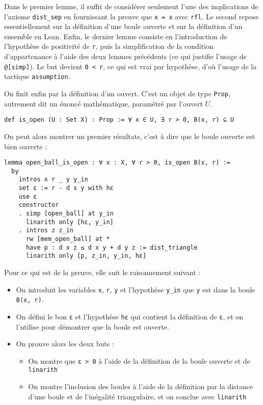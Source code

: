 \documentclass[a4paper, 12pt]{article}
\newcommand{\lean}[1]{\texttt{#1}}
\begin{document}
Dans le premier lemme, il suffit de considérer seulement l'une des implications de l'axiome \lean{dist_sep} en fournissant la preuve que \lean{x = x} avec \lean{rfl}. Le second repose essentiellement sur la définition d'une boule ouverte et sur la définition d'un ensemble en Lean. Enfin, le dernier lemme consiste en l'introduction de l'hypothèse de positivité de \lean{r}, puis la simplification de la condition d'appartenance à l'aide des deux lemmes précédents (ce qui justifie l'usage de \lean{@[simp]}). Le but devient \lean{0 < r}, ce qui est vrai par hypothèse, d'où l'usage de la tactique \lean{assumption}.

On finit enfin par la définition d'un ouvert. C'est un objet de type \lean{Prop}, autrement dit un énoncé mathématique, paramétré par l'ouvert $U$.

\begin{verbatim}
def is_open (U : Set X) : Prop := ∀ x ∈ U, ∃ r > 0, B(x, r) ⊆ U
\end{verbatim}

On peut alors montrer un premier résultats, c'est à dire que le boule ouverte est bien ouverte :

\begin{verbatim}
lemma open_ball_is_open : ∀ x : X, ∀ r > 0, is_open B(x, r) :=
  by
    intros x r _ y y_in
    set ε := r - d x y with hε
    use ε
    constructor
    . simp [open_ball] at y_in
      linarith only [hε, y_in]
    . intros z z_in
      rw [mem_open_ball] at *
      have p : d x z ≤ d x y + d y z := dist_triangle
      linarith only [p, z_in, y_in, hε]
\end{verbatim}

Pour ce qui est de la preuve, elle suit le raisonnement suivant :

\begin{itemize}
    \item On introduit les variables \lean{x}, \lean{r}, \lean{y} et l'hypothèse \lean{y_in} que \lean{y} est dans la boule \lean{B(x, r)}.
    \item On défini le bon \lean{ε} et l'hypothèse \lean{hε} qui contient la définition de \lean{ε}, et on l'utilise pour démontrer que la boule est ouverte.
    \item On prouve alors les deux buts :
        \begin{itemize}
            \item On montre que \lean{ε > 0} à l'aide de la définition de la boule ouverte et de \lean{linarith}
            \item On montre l'inclusion des boules à l'aide de la définition par la distance d'une boule et de l'inégalité triangulaire, et on conclue avec \lean{linarith}
        \end{itemize}
\end{itemize}
\end{document}
